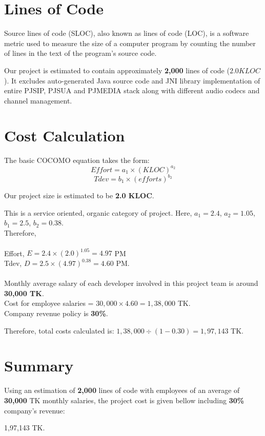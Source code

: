\section{Lines of Code}
Source lines of code (SLOC), also known as lines of code (LOC), is a software metric used to measure the size of a computer program by counting the number of lines in the text of the program's source code.

Our project is estimated to contain approximately \textbf{2,000} lines of code ($2.0 KLOC$). It excludes auto-generated Java source code and JNI library implementation of entire PJSIP, PJSUA and PJMEDIA stack along with different audio codecs and channel management.

\section{Cost Calculation}
The basic COCOMO equation takes the form:
$$Effort = a_1 \times (KLOC) ^ {a_2}$$
$$Tdev = b_1 \times (efforts) ^ {b_2}$$

Our project size is estimated to be \textbf{2.0 KLOC}.

This is a service oriented, organic category of project. Here, $a_1 = 2.4$, $a_2 = 1.05$, $b_1 = 2.5$, $b_2 = 0.38$. \\
Therefore, \\
\\
Effort, $E = 2.4 \times (2.0) ^ {1.05} = 4.97$ PM \\
Tdev, $D = 2.5 \times (4.97) ^ {0.38} = 4.60$ PM.
\\
\\
Monthly average salary of each developer involved in this project team is around \textbf{30,000 TK}. \\
Cost for employee salaries = $30,000 \times 4.60 = 1,38,000$ TK.\\
Company revenue policy is \textbf{30\%}.

Therefore, total costs calculated is: $1,38,000 \div ({1 - 0.30}) = 1,97,143$ TK.

\section{Summary}
Using an estimation of \textbf{2,000} lines of code with employees of an average of \textbf{30,000} TK monthly salaries, the project cost is given bellow including \textbf{30\%} company's revenue:
\\
\begin{center}
    \huge 1,97,143 TK.
\end{center}
